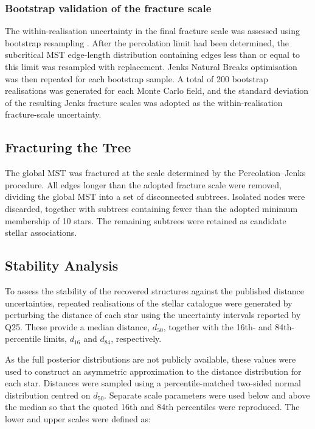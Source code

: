 \documentclass[fleqn,usenatbib]{mnras}
\begin{document}
\subsubsection{Bootstrap validation of the fracture scale}
The within-realisation uncertainty in the final fracture scale was assessed using bootstrap resampling \citep{Efron1979}. After the percolation limit had been determined, the subcritical MST edge-length distribution containing edges less than or equal to this limit was resampled with replacement. Jenks Natural Breaks optimisation was then repeated for each bootstrap sample. A total of 200 bootstrap realisations was generated for each Monte Carlo field, and the standard deviation of the resulting Jenks fracture scales was adopted as the within-realisation fracture-scale uncertainty.

\subsection{Fracturing the Tree}
The global MST was fractured at the scale determined by the Percolation–Jenks procedure. All edges longer than the adopted fracture scale were removed, dividing the global MST into a set of disconnected subtrees. Isolated nodes were discarded, together with subtrees containing fewer than the adopted minimum membership of 10 stars. The remaining subtrees were retained as candidate stellar associations. 

\subsection{Stability Analysis}
\label{sec:stability}

To assess the stability of the recovered structures against the published
distance uncertainties, repeated realisations of the stellar catalogue were
generated by perturbing the distance of each star using the uncertainty
intervals reported by Q25. These provide a median distance, $d_{50}$,
together with the 16th- and 84th-percentile limits, $d_{16}$ and $d_{84}$,
respectively.

As the full posterior distributions are not publicly available, these values
were used to construct an asymmetric approximation to the distance
distribution for each star. Distances were sampled using a percentile-matched
two-sided normal distribution centred on $d_{50}$. Separate scale parameters
were used below and above the median so that the quoted 16th and 84th
percentiles were reproduced. The lower and upper scales were defined as:
\end{document}
